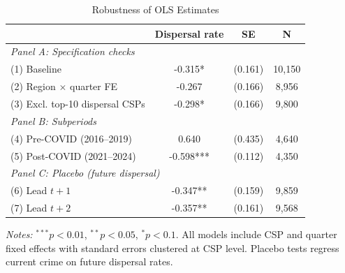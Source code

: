 \begin{table}[t]
\centering
\caption{Robustness of OLS Estimates}
\label{tab:robustness}
\small
\begin{tabular}{lccc}
\hline\hline
 & Dispersal rate & SE & N \\
\hline
\multicolumn{4}{l}{\textit{Panel A: Specification checks}} \\
(1) Baseline & -0.315* & (0.161) & 10,150 \\
(2) Region $\times$ quarter FE & -0.267 & (0.166) & 8,956 \\
(3) Excl. top-10 dispersal CSPs & -0.298* & (0.166) & 9,800 \\
\hline
\multicolumn{4}{l}{\textit{Panel B: Subperiods}} \\
(4) Pre-COVID (2016--2019) & 0.640 & (0.435) & 4,640 \\
(5) Post-COVID (2021--2024) & -0.598*** & (0.112) & 4,350 \\
\hline
\multicolumn{4}{l}{\textit{Panel C: Placebo (future dispersal)}} \\
(6) Lead $t+1$ & -0.347** & (0.159) & 9,859 \\
(7) Lead $t+2$ & -0.357** & (0.161) & 9,568 \\
\hline\hline
\end{tabular}
\begin{tablenotes}\small
\item \textit{Notes:} $^{***}p<0.01$, $^{**}p<0.05$, $^{*}p<0.1$. All models include CSP and quarter fixed effects with standard errors clustered at CSP level. Placebo tests regress current crime on future dispersal rates.
\end{tablenotes}
\end{table}
